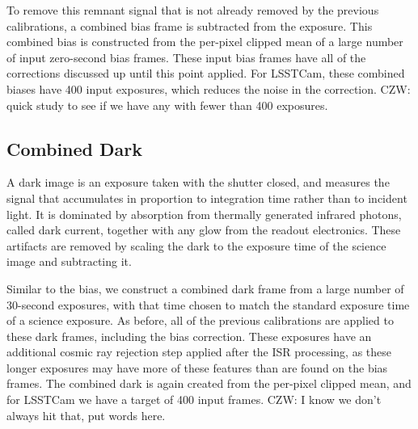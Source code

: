 To remove this remnant signal that is not already removed by the previous calibrations, a combined bias frame is subtracted from the exposure.
This combined bias is constructed from the per-pixel clipped mean of a large number of input zero-second bias frames.
These input bias frames have all of the corrections discussed up until this point applied.
For LSSTCam, these combined biases have 400 input exposures, which reduces the noise in the correction.
CZW: quick study to see if we have any with fewer than 400 exposures.

\subsection{Combined Dark} \label{sec:processing:calibration:dark}

A dark image is an exposure taken with the shutter closed, and measures the signal that accumulates in proportion to integration time rather than to incident light. It is dominated by absorption from thermally generated infrared photons, called dark current, together with any glow from the readout electronics.
These artifacts are removed by scaling the dark to the exposure time of the science image and subtracting it.

Similar to the bias, we construct a combined dark frame from a large number of 30-second exposures, with that time chosen to match the standard exposure time of a science exposure.
As before, all of the previous calibrations are applied to these dark frames, including the bias correction.
These exposures have an additional cosmic ray rejection step applied after the ISR processing, as these longer exposures may have more of these features than are found on the bias frames.
The combined dark is again created from the per-pixel clipped mean, and for LSSTCam we have a target of 400 input frames.
CZW: I know we don't always hit that, put words here.

